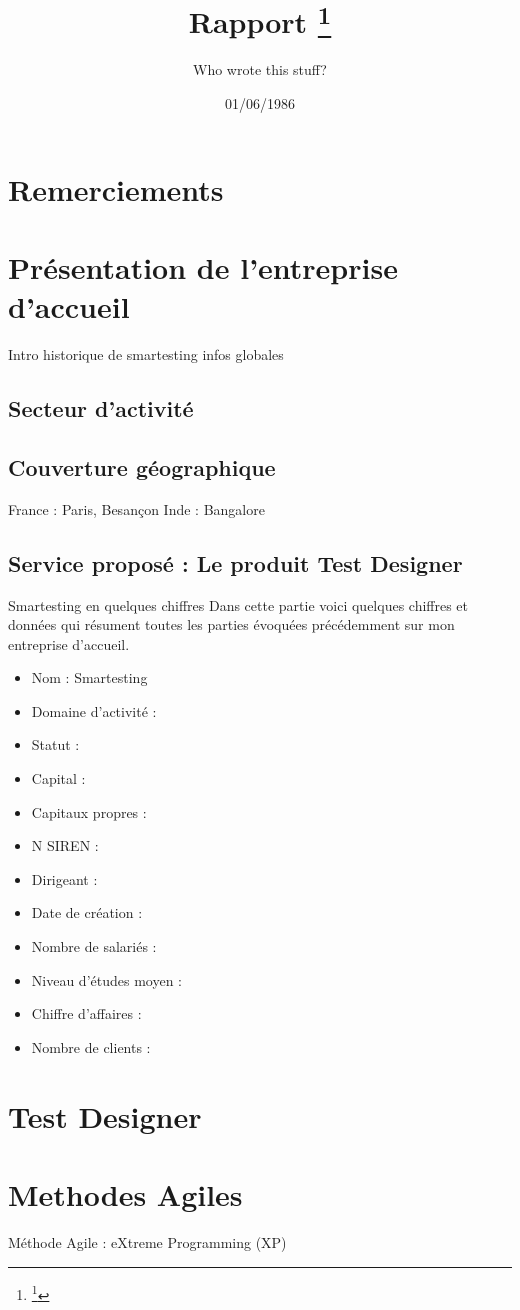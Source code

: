 \documentclass{article}
\title{Rapport
	\footnote{\thanks{A special form of footnote}}}
\author{Who wrote this stuff?}
\date{01/06/1986}
\begin{document}
\section{Remerciements}

\section{Présentation de l'entreprise d'accueil}
Intro historique de smartesting infos globales
\subsection{Secteur d'activité}

\subsection{Couverture géographique}
France : Paris, Besançon
Inde : Bangalore
\subsection{Service proposé : Le produit Test Designer}
Smartesting en quelques chiffres
Dans cette partie voici quelques chiffres et données qui résument toutes les parties évoquées précédemment sur mon entreprise d'accueil.
\begin{itemize}
\item{Nom : Smartesting} 
\item{Domaine d'activité :} 
\item{Statut :} 
\item{Capital :} 
\item{Capitaux propres :} 
\item{N SIREN :} 
\item{Dirigeant :} 
\item{Date de création : } 
\item{Nombre de salariés :} 
\item{Niveau d'études moyen :} 
\item{Chiffre d'affaires :} 
\item{Nombre de clients :} 
\end{itemize}

\section{Test Designer}

\section{Methodes Agiles}
Méthode Agile : eXtreme Programming  (XP)
\end{document}
